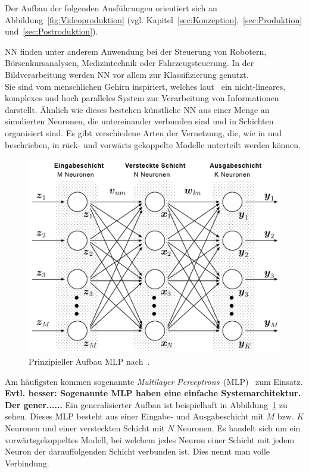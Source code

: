 \documentclass[times, 11pt,twocolumn]{article}
\begin{document}
Der Aufbau der folgenden Ausführungen orientiert sich an Abbildung~\ref{fig:Videoproduktion} (vgl. Kapitel~\ref{sec:Konzeption},~\ref{sec:Produktion} und~\ref{sec:Postroduktion}).



 \label{sec:NeuronaleNetze}
NN finden unter anderem Anwendung bei der Steuerung von Robotern, Börsenkursanalysen, Medizintechnik oder Fahrzeugsteuerung. In der Bildverarbeitung werden NN vor allem zur Klassifizierung genutzt. \\
Sie sind vom menschlichen Gehirn inspiriert, welches laut~\cite{NNHaykin} ein nicht-lineares, komplexes und hoch paralleles System zur Verarbeitung von Informationen darstellt. Ähnlich wie dieses bestehen künstliche NN aus einer Menge an simulierten Neuronen, die untereinander verbunden sind und in Schichten organisiert sind. Es gibt verschiedene Arten der Vernetzung, die, wie in \cite{NNHaykin} und \cite{NNStanley} beschrieben, in rück- und vorwärts gekoppelte Modelle unterteilt werden können.\\
\begin{figure}
	\flushleft
	\includegraphics[width=\columnwidth]{Bilder/structure-mlp.jpg}
	\caption{Prinzipieller Aufbau MLP nach~\cite{MDPI}.}
	\label{fig:MLP}
\end{figure}
Am häufigsten kommen sogenannte \textit{Multilayer Perceptrons}~(MLP)~\cite{NNBraun}\cite{NNNauck}\cite{NNStanley} zum Einsatz. \textbf{Evtl. besser: Sogenannte MLP haben eine einfache Systemarchitektur. Der gener......} Ein generalisierter Aufbau ist beispielhaft in Abbildung~\ref{fig:MLP} zu sehen. Dieses MLP besteht aus einer Eingabe- und Ausgabeschicht mit $M$ bzw. $K$ Neuronen und einer versteckten Schicht mit $N$ Neuronen. Es handelt sich um ein vorwärtsgekoppeltes Modell, bei welchem jedes Neuron einer Schicht mit jedem Neuron der darauffolgenden Schicht verbunden ist. Dies nennt man volle Verbindung. \\
\end{document}
